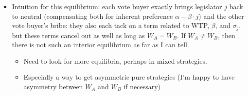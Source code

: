 \documentclass[12pt]{article}
\begin{document}
\begin{enumerate}
\begin{itemize}
\begin{itemize}
						\item Intuition for this equilibrium: each vote buyer exactly brings legislator $j$ back to neutral (compensating both for inherent preference $\alpha - \beta \cdot j$) and the other vote buyer's bribe; they also each tack on a term related to WTP, $\beta$, and $\sigma_j$, but these terms cancel out as well as long as $W_A = W_B$. If $W_A \neq W_B$, then there is not such an interior equilibrium as far as I can tell. 
							\begin{itemize}
								\item Need to look for more equilibria, perhaps in mixed strategies.
								\item Especially a way to get asymmetric pure strategies (I'm happy to have asymmetry between $W_A$ and $W_B$ if necessary)
							\end{itemize}
					\end{itemize}
		\end{itemize}
\end{enumerate}
\end{document}
